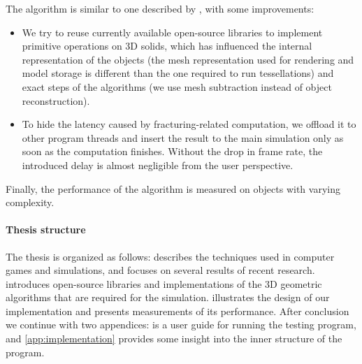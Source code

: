 The algorithm is similar to one described by \citet{nvidia}, with some improvements:
\begin{itemize}
\item We try to reuse currently available open-source libraries to implement primitive operations on 3D solids, which has influenced the internal representation of the objects (\eg the mesh representation used for rendering and model storage is different than the one required to run tessellations) and exact steps of the algorithms (\eg we use mesh subtraction instead of object reconstruction).
\item To hide the latency caused by fracturing-related computation, we offload it to other program threads and insert the result to the main simulation only as soon as the computation finishes. Without the drop in frame rate, the introduced delay is almost negligible from the user perspective.
\end{itemize}

Finally, the performance of the algorithm is measured on objects with varying complexity.

\paragraph{Thesis structure}
The thesis is organized as follows:  describes the techniques used in computer games and simulations, and focuses on several results of recent research.  introduces open-source libraries and implementations of the 3D geometric algorithms that are required for the simulation.  illustrates the design of our implementation and presents measurements of its performance. After conclusion we continue with two appendices:  is a user guide for running the testing program, and \cref{app:implementation} provides some insight into the inner structure of the program. 

